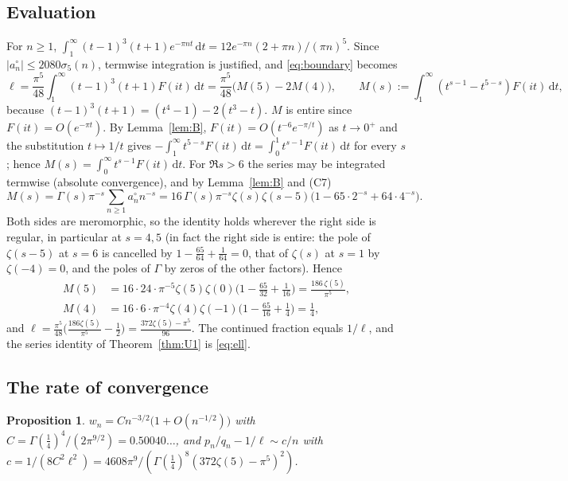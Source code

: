 \documentclass[11pt]{amsart}
\newtheorem{proposition}[theorem]{Proposition}
\theoremstyle{definition}
\theoremstyle{remark}
\numberwithin{equation}{section}
\newcommand{\dd}{\,\mathrm{d}}
\begin{document}
\subsection{Evaluation}
For $n\ge1$, $\int_1^\infty(t-1)^3(t+1)e^{-\pi nt}\dd t=12e^{-\pi n}(2+\pi n)/(\pi n)^5$. Since $|a^\circ_n|\le2080\sigma_5(n)$, termwise integration is justified, and \eqref{eq:boundary} becomes
\begin{equation}\label{eq:mellin}
\ell=\frac{\pi^5}{48}\int_1^\infty(t-1)^3(t+1)F(it)\dd t=\frac{\pi^5}{48}\bigl(M(5)-2M(4)\bigr),\qquad M(s):=\int_1^\infty(t^{s-1}-t^{5-s})F(it)\dd t,
\end{equation}
because $(t-1)^3(t+1)=(t^4-1)-2(t^3-t)$. $M$ is entire since $F(it)=O(e^{-\pi t})$. By Lemma~\ref{lem:B}, $F(it)=O(t^{-6}e^{-\pi/t})$ as $t\to0^+$ and the substitution $t\mapsto1/t$ gives $-\int_1^\infty t^{5-s}F(it)\dd t=\int_0^1t^{s-1}F(it)\dd t$ for every $s$; hence $M(s)=\int_0^\infty t^{s-1}F(it)\dd t$. For $\Re s>6$ the series may be integrated termwise (absolute convergence), and by Lemma~\ref{lem:B} and (C7)
\[
M(s)=\Gamma(s)\pi^{-s}\sum_{n\ge1}a^\circ_nn^{-s}=16\,\Gamma(s)\pi^{-s}\zeta(s)\zeta(s-5)\bigl(1-65\cdot2^{-s}+64\cdot4^{-s}\bigr).
\]
Both sides are meromorphic, so the identity holds wherever the right side is regular, in particular at $s=4,5$ (in fact the right side is entire: the pole of $\zeta(s-5)$ at $s=6$ is cancelled by $1-\frac{65}{64}+\frac1{64}=0$, that of $\zeta(s)$ at $s=1$ by $\zeta(-4)=0$, and the poles of $\Gamma$ by zeros of the other factors). Hence
\begin{align*}
M(5)&=16\cdot24\cdot\pi^{-5}\zeta(5)\zeta(0)\bigl(1-\tfrac{65}{32}+\tfrac1{16}\bigr)=\frac{186\,\zeta(5)}{\pi^5},\\
M(4)&=16\cdot6\cdot\pi^{-4}\zeta(4)\zeta(-1)\bigl(1-\tfrac{65}{16}+\tfrac14\bigr)=\frac14,
\end{align*}
and $\ell=\frac{\pi^5}{48}\bigl(\frac{186\zeta(5)}{\pi^5}-\frac12\bigr)=\frac{372\zeta(5)-\pi^5}{96}$. The continued fraction equals $1/\ell$, and the series identity of Theorem~\ref{thm:U1} is \eqref{eq:ell}.

\subsection{The rate of convergence}
\begin{proposition}\label{prop:rate}
$w_n=Cn^{-3/2}\bigl(1+O(n^{-1/2})\bigr)$ with $C=\Gamma(\frac14)^4/(2\pi^{9/2})=0.50040\ldots$, and $p_n/q_n-1/\ell\sim c/n$ with $c=1/(8C^2\ell^2)=4608\pi^9/(\Gamma(\frac14)^8(372\zeta(5)-\pi^5)^2)$.
\end{proposition}
\end{document}
